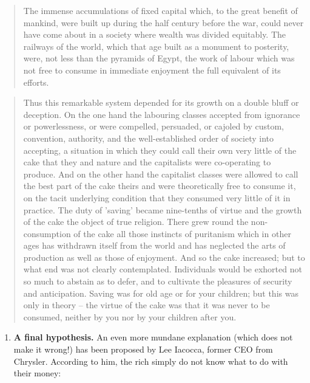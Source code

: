 \documentclass[]{book}
\providecommand{\tightlist}{%
  \setlength{\itemsep}{0pt}\setlength{\parskip}{0pt}}
\theoremstyle{definition}
\theoremstyle{definition}
\theoremstyle{definition}
\theoremstyle{remark}
\begin{document}
\begin{quote}
The immense accumulations of fixed capital which, to the great benefit
of mankind, were built up during the half century before the war, could
never have come about in a society where wealth was divided equitably.
The railways of the world, which that age built as a monument to
posterity, were, not less than the pyramids of Egypt, the work of labour
which was not free to consume in immediate enjoyment the full equivalent
of its efforts.
\end{quote}

\begin{quote}
Thus this remarkable system depended for its growth on a double bluff or
deception. On the one hand the labouring classes accepted from ignorance
or powerlessness, or were compelled, persuaded, or cajoled by custom,
convention, authority, and the well-established order of society into
accepting, a situation in which they could call their own very little of
the cake that they and nature and the capitalists were co-operating to
produce. And on the other hand the capitalist classes were allowed to
call the best part of the cake theirs and were theoretically free to
consume it, on the tacit underlying condition that they consumed very
little of it in practice. The duty of 'saving' became nine-tenths of
virtue and the growth of the cake the object of true religion. There
grew round the non-consumption of the cake all those instincts of
puritanism which in other ages has withdrawn itself from the world and
has neglected the arts of production as well as those of enjoyment. And
so the cake increased; but to what end was not clearly contemplated.
Individuals would be exhorted not so much to abstain as to defer, and to
cultivate the pleasures of security and anticipation. Saving was for old
age or for your children; but this was only in theory -- the virtue of
the cake was that it was never to be consumed, neither by you nor by
your children after you.
\end{quote}

\begin{enumerate}
\def\labelenumi{\arabic{enumi}.}
\setcounter{enumi}{4}
\tightlist
\item
  \textbf{A final hypothesis.} An even more mundane explanation (which
  does not make it wrong!) has been proposed by Lee Iacocca, former CEO
  from Chrysler. According to him, the rich simply do not know what to
  do with their money:
\end{enumerate}
\end{document}
